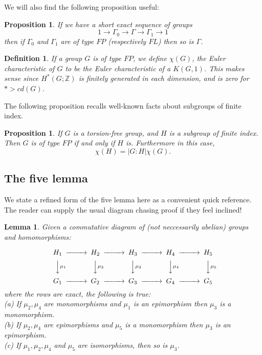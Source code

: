 \documentclass{amsart}
\newtheorem{prop}[thm]{Proposition}
\newtheorem{lem}[thm]{Lemma}
\newtheorem{defn}[thm]{Definition}
\begin{document}
We will also find the following proposition useful:

\begin{prop}
\label{prop: seqFP}
If we have a short exact sequence of groups
$$
1 \rightarrow \Gamma_0 \rightarrow \Gamma \rightarrow \Gamma_1 \rightarrow 1
$$
then if $\Gamma_0$ and $\Gamma_1$ are of type $FP$ (respectively $FL$) then
so is $\Gamma$.
\end{prop}

\begin{defn}
If a group $G$ is of type $FP$, we define $\chi(G)$, the Euler characteristic 
of $G$ to be the Euler characteristic of a $K(G,1)$. This makes sense
since $H^*(G;\mathbb{Z})$ is finitely generated in each dimension, and
is zero for $* > cd(G)$.
\end{defn}

The following proposition recalls well-known facts about subgroups of finite
index.

\begin{prop}
\label{prop: Eulerfinindex}
If $G$ is a torsion-free group, and $H$ is a subgroup of finite 
index. Then 
$G$ is of type $FP$ if and only if $H$ is. Furthermore in this case, 
$$
\chi(H) = |G:H|\chi(G).
$$ 
\end{prop}

\subsection{The five lemma}
We state a refined form of the five lemma here as a 
convenient quick reference. The reader can supply the usual
diagram chasing proof if they feel inclined!

\begin{lem}
\label{lem: 5lem}
Given a commutative diagram of (not neccessarily abelian) groups
and homomorphisms:

$$
\begin{CD}
H_1 @>>> H_2 @>>> H_3 @>>> H_4 @>>> H_5 \\
@VV \mu_1 V @VV \mu_2 V @VV \mu_3 V @VV \mu_4 V @VV \mu_5 V \\
G_1 @>>> G_2 @>>> G_3 @>>> G_4 @>>> G_5
\end{CD}
$$
where the rows are exact, the following is true: \\

\noindent
(a) If $\mu_2,\mu_4$ are monomorphisms and $\mu_1$ is an
epimorphism then $\mu_3$ is a monomorphism. \\

\noindent
(b) If $\mu_2,\mu_4$ are epimorphisms and $\mu_5$ is a
monomorphism then $\mu_3$ is an epimorphism. \\

\noindent
(c) If $\mu_1,\mu_2,\mu_4$ and $\mu_5$ are isomorphisms,
then so is $\mu_3$.
\end{lem}
\end{document}
